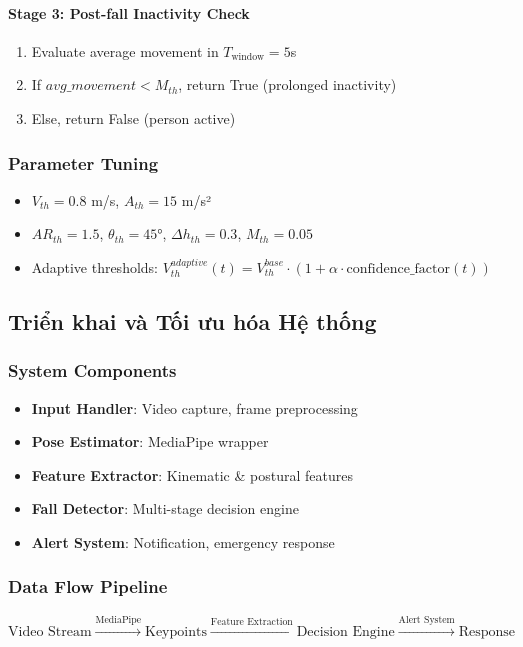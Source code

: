 \paragraph{Stage 3: Post-fall Inactivity Check}
\begin{enumerate}
\item Evaluate average movement in $T_{\text{window}} = 5$s
\item If $avg\_movement < M_{th}$, return True (prolonged inactivity)
\item Else, return False (person active)
\end{enumerate}

\subsubsection{Parameter Tuning}
\begin{itemize}
\item $V_{th} = 0.8$ m/s, $A_{th} = 15$ m/s²
\item $AR_{th} = 1.5$, $\theta_{th} = 45°$, $\Delta h_{th} = 0.3$, $M_{th} = 0.05$
\item Adaptive thresholds: $V_{th}^{adaptive}(t) = V_{th}^{base} \cdot (1 + \alpha \cdot \text{confidence\_factor}(t))$
\end{itemize}

\subsection{Triển khai và Tối ưu hóa Hệ thống}

\subsubsection{System Components}
\begin{itemize}
    \item \textbf{Input Handler}: Video capture, frame preprocessing
    \item \textbf{Pose Estimator}: MediaPipe wrapper
    \item \textbf{Feature Extractor}: Kinematic \& postural features
    \item \textbf{Fall Detector}: Multi-stage decision engine
    \item \textbf{Alert System}: Notification, emergency response
\end{itemize}

\subsubsection{Data Flow Pipeline}
\begin{equation}
\text{Video Stream} \xrightarrow{\text{MediaPipe}} \text{Keypoints} 
\xrightarrow{\text{Feature Extraction}} \text{Decision Engine} 
\xrightarrow{\text{Alert System}} \text{Response}
\end{equation}
